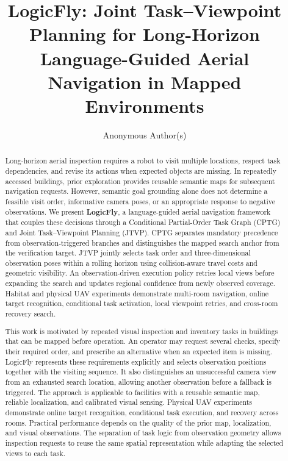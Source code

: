 \documentclass[letterpaper,10pt,journal]{IEEEtran}
\title{LogicFly: Joint Task--Viewpoint Planning for Long-Horizon Language-Guided Aerial Navigation in Mapped Environments}
\author{Anonymous Author(s)}
\newenvironment{practitioners}{\renewcommand{\abstractname}{Note to Practitioners}\begin{abstract}}{\end{abstract}}
\begin{document}
\maketitle
\begin{abstract}
Long-horizon aerial inspection requires a robot to visit multiple locations, respect task dependencies, and revise its actions when expected objects are missing. In repeatedly accessed buildings, prior exploration provides reusable semantic maps for subsequent navigation requests. However, semantic goal grounding alone does not determine a feasible visit order, informative camera poses, or an appropriate response to negative observations. We present \textbf{LogicFly}, a language-guided aerial navigation framework that couples these decisions through a Conditional Partial-Order Task Graph (CPTG) and Joint Task--Viewpoint Planning (JTVP). CPTG separates mandatory precedence from observation-triggered branches and distinguishes the mapped search anchor from the verification target. JTVP jointly selects task order and three-dimensional observation poses within a rolling horizon using collision-aware travel costs and geometric visibility. An observation-driven execution policy retries local views before expanding the search and updates regional confidence from newly observed coverage. Habitat and physical UAV experiments demonstrate multi-room navigation, online target recognition, conditional task activation, local viewpoint retries, and cross-room recovery search.
\end{abstract}

\begin{practitioners}
This work is motivated by repeated visual inspection and inventory tasks in buildings that can be mapped before operation. An operator may request several checks, specify their required order, and prescribe an alternative when an expected item is missing. LogicFly represents these requirements explicitly and selects observation positions together with the visiting sequence. It also distinguishes an unsuccessful camera view from an exhausted search location, allowing another observation before a fallback is triggered. The approach is applicable to facilities with a reusable semantic map, reliable localization, and calibrated visual sensing. Physical UAV experiments demonstrate online target recognition, conditional task execution, and recovery across rooms. Practical performance depends on the quality of the prior map, localization, and visual observations. The separation of task logic from observation geometry allows inspection requests to reuse the same spatial representation while adapting the selected views to each task.
\end{practitioners}
\end{document}
